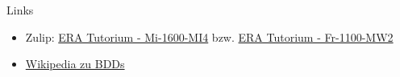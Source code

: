 \documentclass[
  german,            %
  aspectratio=169,    %
]{tumbeamer}
\begin{document}
\begin{frame}[fragile, c]{Links}{}
  \begin{itemize}
    \item Zulip: \href{https://zulip.in.tum.de/#narrow/stream/1917-ERA-Tutorium---Mi-1600-MI4}{\glqq ERA Tutorium - Mi-1600-MI4\grqq}
          bzw. \href{https://zulip.in.tum.de/#narrow/stream/1940-ERA-Tutorium---Fr-1100-MW2}{\glqq ERA Tutorium - Fr-1100-MW2\grqq}
    \item \href{https://en.wikipedia.org/wiki/Binary_decision_diagram}{Wikipedia zu BDDs}
  \end{itemize}
\end{frame}

\maketitle
\end{document}
